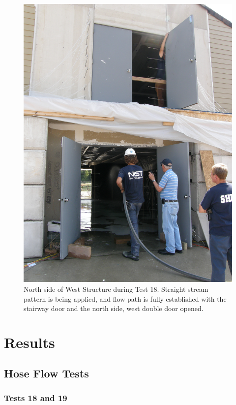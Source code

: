 \documentclass[12pt,oneside]{book}
\begin{document}
\begin{figure}[!ht]
\includegraphics[width=6in]{../../Figures/Test_18}
\caption[North Side of West Structure during Test 18]{North side of West Structure during Test 18. Straight stream pattern is being applied, and flow path is fully established with the stairway door and the north side, west double door opened.}
\label{fig:test_19_pic}
\end{figure}

\clearpage

\chapter{Results}
\label{chap:Results}

\section{Hose Flow Tests}

\subsection{Tests 18 and 19}
\end{document}
